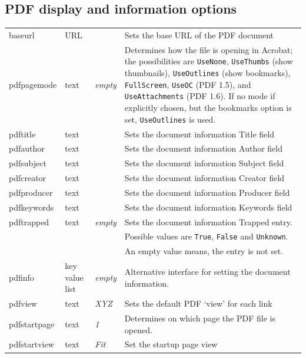 \documentclass[pdftex]{article}
\begin{document}
\subsection{PDF display and information options}
\noindent\begin{longtable}{@{}>{\ttfamily}l>{\raggedright}p{}>{\itshape}lp{7cm}@{}}
baseurl            & URL     &       & Sets the base URL of the PDF document \\
pdfpagemode        & text    & empty & Determines how the file is opening in Acrobat; the possibilities are
                                       \texttt{UseNone}, \texttt{UseThumbs} (show thumbnails), \texttt{UseOutlines}
                                       (show bookmarks), \texttt{FullScreen}, \texttt{UseOC} (PDF 1.5),
                                       and \texttt{UseAttachments} (PDF 1.6). If no mode if explicitly chosen, but the
                                       bookmarks option is set, \texttt{UseOutlines} is used. \\
pdftitle           & text    &       & Sets the document information Title field \\
pdfauthor          & text    &       & Sets the document information Author field \\
pdfsubject         & text    &       & Sets the document information Subject field \\
pdfcreator         & text    &       & Sets the document information Creator field \\
pdfproducer        & text    &       & Sets the document information Producer field \\
pdfkeywords        & text    &       & Sets the document information Keywords field \\
pdftrapped         & text    & empty & Sets the document information Trapped entry.\\
&&& Possible values are \texttt{True}, \texttt{False} and \texttt{Unknown}.\\
&&& An empty value means, the entry is not set.\\
pdfinfo            & key value list & empty & Alternative interface for setting the
                                              document information.\\
pdfview            & text    & XYZ   & Sets the default PDF `view' for each link \\
pdfstartpage       & text    & 1     & Determines on which page the PDF file is opened. \\
pdfstartview       & text    & Fit   & Set the startup page view \\

\end{longtable}
\end{document}
